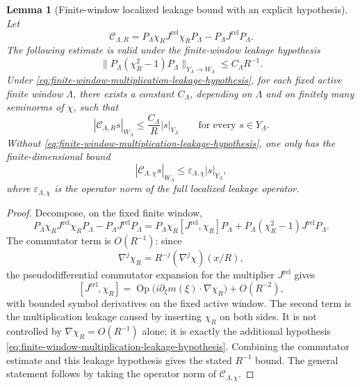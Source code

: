 \documentclass[11pt]{article}
\numberwithin{equation}{section}
\newtheorem{lemma}[theorem]{Lemma}
\begin{document}
\begin{lemma}[Finite-window localized leakage bound with an explicit hypothesis]\label{lem:finite-window-commutator-bound}
Let
\[
        \mathcal C_{\Lambda,R}
        =P_\Lambda\chi_RJ^{\mathrm{rel}}\chi_RP_\Lambda
        -P_\Lambda J^{\mathrm{rel}}P_\Lambda.
\]
The following estimate is valid under the finite-window leakage hypothesis
\begin{equation}\label{eq:finite-window-multiplication-leakage-hypothesis}
        \|P_\Lambda(\chi_R^2-1)P_\Lambda\|_{Y_\Lambda\to W_\Lambda}
        \le C_\Lambda R^{-1}.
\end{equation}
Under \eqref{eq:finite-window-multiplication-leakage-hypothesis}, for each fixed active finite window \(\Lambda\), there exists a constant \(C_\Lambda\), depending on \(\Lambda\) and on finitely many seminorms of \(\chi\), such that
\[
        |\mathcal C_{\Lambda,R}s|_{W_\Lambda}
        \le
        \frac{C_\Lambda}{R}|s|_{Y_\Lambda}
        \qquad
        \text{for every }s\in Y_\Lambda.
\]
Without \eqref{eq:finite-window-multiplication-leakage-hypothesis}, one only has the finite-dimensional bound
\[
        |\mathcal C_{\Lambda,\chi}s|_{W_\Lambda}
        \le
        \varepsilon_{\Lambda,\chi}|s|_{Y_\Lambda},
\]
where \(\varepsilon_{\Lambda,\chi}\) is the operator norm of the full localized leakage operator.
\end{lemma}

\begin{proof}
Decompose, on the fixed finite window,
\[
P_\Lambda\chi_RJ^{\mathrm{rel}}\chi_RP_\Lambda-P_\Lambda J^{\mathrm{rel}}P_\Lambda
=
P_\Lambda\chi_R[J^{\mathrm{rel}},\chi_R]P_\Lambda
+P_\Lambda(\chi_R^2-1)J^{\mathrm{rel}}P_\Lambda.
\]
The commutator term is \(O(R^{-1})\): since
\[
        \nabla^j\chi_R=R^{-j}(\nabla^j\chi)(x/R),
\]
the pseudodifferential commutator expansion for the multiplier \(J^{\mathrm{rel}}\) gives
\[
        [J^{\mathrm{rel}},\chi_R]
        =\operatorname{Op}\bigl(i\partial_\xi m(\xi)\cdot\nabla\chi_R\bigr)
        +O(R^{-2}),
\]
with bounded symbol derivatives on the fixed active window.  The second term is the multiplication leakage caused by inserting \(\chi_R\) on both sides.  It is not controlled by \(\nabla\chi_R=O(R^{-1})\) alone; it is exactly the additional hypothesis \eqref{eq:finite-window-multiplication-leakage-hypothesis}.  Combining the commutator estimate and this leakage hypothesis gives the stated \(R^{-1}\) bound.  The general statement follows by taking the operator norm of \(\mathcal C_{\Lambda,\chi}\).
\end{proof}
\end{document}
